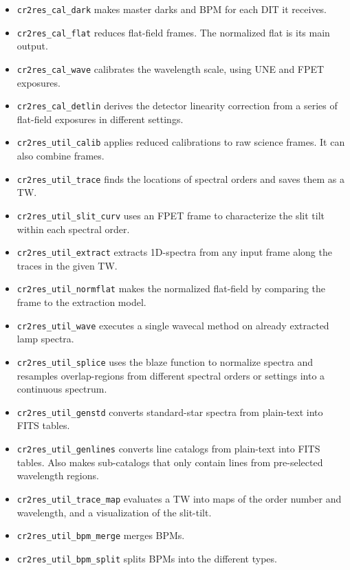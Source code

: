 \begin{itemize}
    \item \texttt{cr2res\_cal\_dark} makes master darks and BPM for each DIT it
    receives.
    \item \texttt{cr2res\_cal\_flat} reduces flat-field frames. The normalized
    flat is its main output.
    \item \texttt{cr2res\_cal\_wave} calibrates the wavelength scale, using UNE
    and FPET exposures.
    \item \texttt{cr2res\_cal\_detlin} derives the detector linearity correction
    from a series of flat-field exposures in different settings.
    \item \texttt{cr2res\_util\_calib} applies reduced calibrations to raw
    science frames. It can also combine frames.
    \item \texttt{cr2res\_util\_trace} finds the locations of spectral orders
    and saves them as a TW.
    \item \texttt{cr2res\_util\_slit\_curv} uses an FPET frame to characterize
    the slit tilt within each spectral order.
    \item \texttt{cr2res\_util\_extract} extracts 1D-spectra from any input frame
    along the traces in the given TW.
    \item \texttt{cr2res\_util\_normflat} makes the normalized flat-field by
    comparing the frame to the extraction model.
    \item \texttt{cr2res\_util\_wave} executes a single wavecal method on
    already extracted lamp spectra.
    \item \texttt{cr2res\_util\_splice} uses the blaze function to normalize
    spectra and resamples overlap-regions from different spectral orders or
    settings into a continuous spectrum.
    \item \texttt{cr2res\_util\_genstd} converts standard-star spectra from
    plain-text into FITS tables.
    \item \texttt{cr2res\_util\_genlines} converts line catalogs from plain-text
    into FITS tables. Also makes sub-catalogs that only contain lines from
    pre-selected wavelength regions.
    \item \texttt{cr2res\_util\_trace\_map} evaluates a TW into maps of the
    order number and wavelength, and a visualization of the slit-tilt.
    \item \texttt{cr2res\_util\_bpm\_merge} merges BPMs.
    \item \texttt{cr2res\_util\_bpm\_split} splits BPMs into the different
    types.
\end{itemize}

